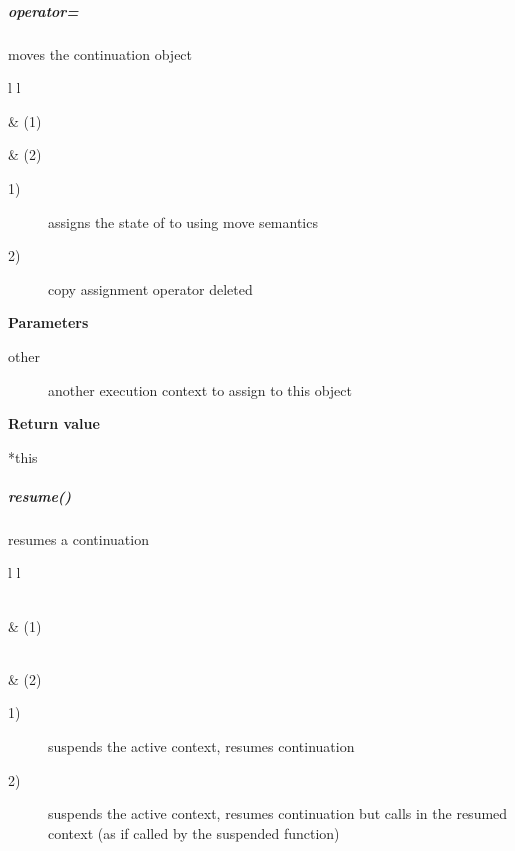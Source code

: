 \subparagraph*{operator=}
moves the continuation object\\

\begin{tabular}{ l l }
    \midrule

     & (1)\\

    \midrule

     & (2)\\

    \midrule
\end{tabular}

\begin{description}
    \item[1)] assigns the state of  to  using move semantics
    \item[2)] copy assignment operator deleted
\end{description}

{\bfseries Parameters}
\begin{description}
    \item[other]   another execution context to assign to this object\\
\end{description}

{\bfseries Return value}
\begin{description}
    \item[*this]
\end{description}


\subparagraph*{resume()}
resumes a continuation\\

\begin{tabular}{ l l }
    \midrule

    \\
     & (1)\\

    \midrule

    \\
     & (2)\\

    \midrule
\end{tabular}

\begin{description}
    \item[1)] suspends the active context, resumes continuation 
    \item[2)] suspends the active context, resumes continuation 
              but calls  in the resumed context (as if called by the
              suspended function)
\end{description}

